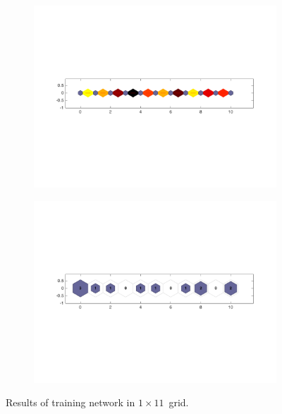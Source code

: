     \begin{figure}
        \begin{subfigure}[b]{0.5\textwidth}
            \centering
            \includegraphics[width=\textwidth]{../images/1d/apps/dist_1_by_11.png}
        \end{subfigure}
        \hfill
        \begin{subfigure}[b]{0.5\textwidth}
             \includegraphics[width=\textwidth]{../images/1d/apps/hit_t_1_by_11.png}
        \end{subfigure}
                \caption{Results of training network in $1\times11$~grid.}
         \label{fig: 1by11T}
    \end{figure}
    

